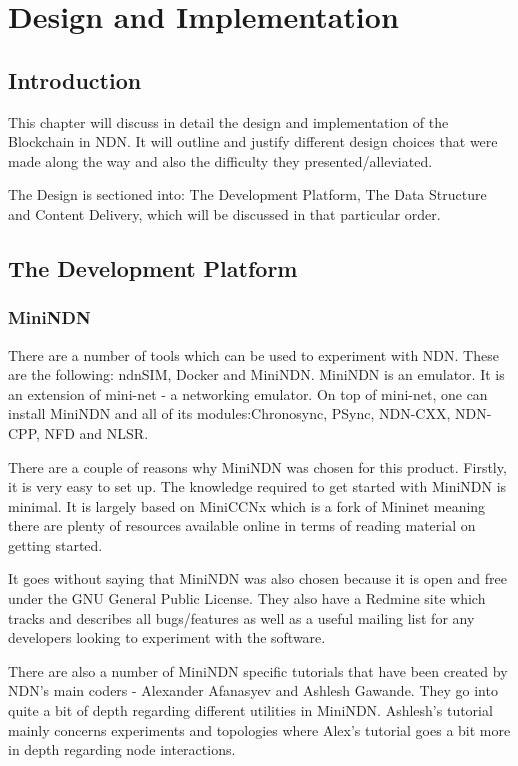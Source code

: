 \chapter{Design and Implementation}
\section{Introduction}
This chapter will discuss in detail the design and implementation of the Blockchain in NDN. It will outline and justify different design choices that were made along the way and also the difficulty they presented/alleviated. 

The Design is sectioned into: The Development Platform, The Data Structure and Content Delivery, which will be discussed in that particular order.
\section{The Development Platform}
\subsection{MiniNDN}
There are a number of tools which can be used to experiment with NDN. These are the following: ndnSIM, Docker and MiniNDN.
MiniNDN is an emulator. It is an extension of mini-net - a networking emulator. On top of mini-net, one can install MiniNDN and all of its modules:Chronosync, PSync, NDN-CXX, NDN-CPP, NFD and NLSR.

There are a couple of reasons why MiniNDN was chosen for this product. Firstly, it is very easy to set up. The knowledge required to get started with MiniNDN is minimal. It is largely based on MiniCCNx which is a fork of  Mininet meaning there are plenty of resources available online in terms of reading material on getting started.

It goes without saying that MiniNDN was also chosen because it is open and free under the GNU General Public License. They also have a Redmine site which tracks and describes all bugs/features as well as a useful mailing list for any developers looking to experiment with the software.

 There are also a number of MiniNDN specific tutorials that have been created by NDN's main coders - Alexander Afanasyev and Ashlesh Gawande. They go into quite a bit of depth regarding different utilities in MiniNDN. Ashlesh's tutorial mainly concerns experiments and topologies where Alex's tutorial goes a bit more in depth regarding node interactions. 
 
